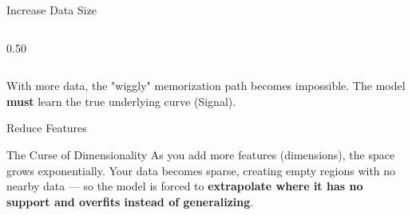 \begin{frame}{Increase Data Size}
\begin{columns}[T]
\begin{column}{0.50\textwidth}
        \end{column}
    \end{columns}
    
    \begin{tcolorbox}[colback=green!5, colframe=green!40]
        \centering
        With more data, the "wiggly" memorization path becomes impossible. The model \textbf{must} learn the true underlying curve (Signal).
    \end{tcolorbox}
\end{frame}


\begin{frame}{Reduce Features}

    \begin{alertblock}{The Curse of Dimensionality}
        As you add more features (dimensions), the space grows exponentially. Your data becomes sparse, creating empty regions with no nearby data --- so the model is forced to \textbf{extrapolate where it has no support and overfits instead of generalizing}.
    \end{alertblock}
\end{frame}

